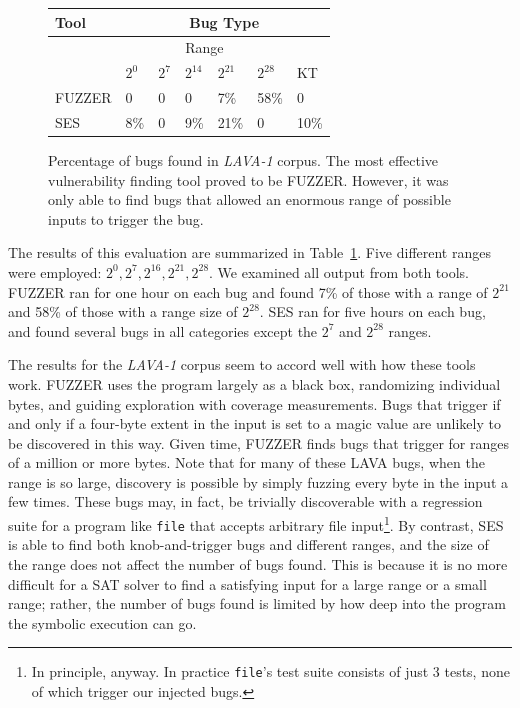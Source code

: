 \begin{figure}[h]
\centering
\begin{tabular}{l|l|l|l|l|l|l} 
Tool   &                     \multicolumn{6}{|c}{Bug Type}                           \\  \hline  
         &                     \multicolumn{5}{|c|}{Range}                   &     \\   
         &    $2^0$   & $2^7$       & $2^{14}$     & $2^{21}$   & $2^{28}$     & KT   \\  \hline 
FUZZER &    0       & 0           & 0            & 7\%        & 58\%         & 0         \\
SES    &    8\%     & 0           & 9\%          & 21\%       & 0            & 10\%         \\
\end{tabular}
\caption{Percentage of bugs found in \emph{LAVA-1} corpus. %
The most effective vulnerability finding tool proved to be FUZZER.  
However, it was only able to find bugs that allowed an enormous range of possible inputs to trigger the bug.}
\label{table:eval1-file}
\end{figure}

The results of this evaluation are summarized in Table~\ref{table:eval1-file}.
Five different ranges were employed: $2^0, 2^7, 2^{16}, 2^{21}, 2^{28}$. 
We examined all output from both tools.
FUZZER ran for one hour on each bug and found 7\% of those with a range of $2^{21}$ and 58\% of those with a range size of $2^{28}$.
SES ran for five hours on each bug, and found several bugs in all categories except the $2^7$ and $2^{28}$ ranges.

The results for the \emph{LAVA-1} corpus seem to accord well with how these tools work.
FUZZER uses the program largely as a black box, randomizing individual bytes, and guiding exploration with coverage measurements.
Bugs that trigger if and only if a four-byte extent in the input is set to a magic value are unlikely to be discovered in this way.
Given time, FUZZER finds bugs that trigger for ranges of a million or more bytes. 
Note that for many of these LAVA bugs, when the range is so large, discovery is possible by simply fuzzing every byte in the input a few times.  
These bugs may, in fact, be trivially discoverable with a regression suite for a program like \verb+file+ that accepts arbitrary file input\footnote{In principle, anyway. In practice \texttt{file}'s test suite consists of just 3 tests, none of which trigger our injected bugs.}.
By contrast, SES is able to find both knob-and-trigger bugs and different ranges, and the size of the range does not affect the number of bugs found.
This is because it is no more difficult for a SAT solver to find a satisfying input for a large range or a small range; rather, the number of bugs found is limited by how deep into the program the symbolic execution can go.

